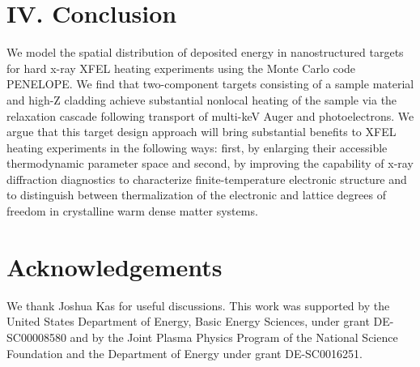 \FloatBarrier

\section{IV. Conclusion}

We model the spatial distribution of deposited energy in nanostructured
targets for hard x-ray XFEL heating experiments using the Monte Carlo
code PENELOPE. We find that two-component targets consisting of a sample
material and high-Z cladding achieve substantial nonlocal heating of the
sample via the relaxation cascade following transport of multi-keV Auger
and photoelectrons. We argue that this target design approach will bring
substantial benefits to XFEL heating experiments in the following ways:
first, by enlarging their accessible thermodynamic parameter space and
second, by improving the capability of x-ray diffraction diagnostics to
characterize finite-temperature electronic structure and to distinguish
between thermalization of the electronic and lattice degrees of freedom
in crystalline warm dense matter systems.

\section*{Acknowledgements}

We thank Joshua Kas for useful discussions. This work was supported by
the United States Department of Energy, Basic Energy Sciences, under
grant DE-SC00008580 and by the Joint Plasma Physics Program of the
National Science Foundation and the Department of Energy under grant
DE-SC0016251. 


